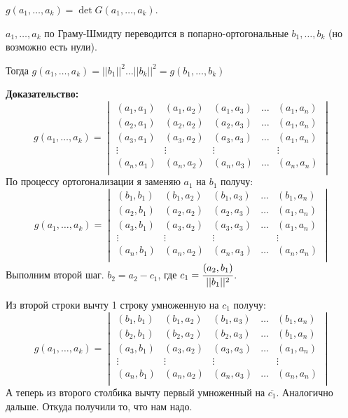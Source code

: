  $g(a_1,\ldots, a_k) = \det G(a_1,\ldots, a_k)$.


$a_1,\ldots, a_k$ по Граму-Шмидту переводится в попарно-ортогональные $b_1,\ldots,b_k$ (но возможно есть нули).

Тогда $g(a_1,\ldots, a_k) = ||b_1||^2\ldots ||b_k||^2 = g(b_1,\ldots,b_k)$

\textbf{Доказательство:}
$$g(a_1,\ldots, a_k) = \begin{vmatrix}
    (a_1,a_1) & (a_1, a_2) & (a_1,a_3) & \ldots & (a_1,a_n)\\
     (a_2,a_1) & (a_2, a_2) & (a_2,a_3) & \ldots & (a_1,a_n)\\
      (a_3,a_1) & (a_3, a_2) & (a_3,a_3) & \ldots & (a_1,a_n)\\
      \vdots & \vdots & \vdots & & \vdots \\
       (a_n,a_1) & (a_n, a_2) & (a_n,a_3) & \ldots & (a_n,a_n)\\
\end{vmatrix}$$
По процессу ортогонализации я заменяю $a_1$ на $b_1$ получу:
$$g(a_1,\ldots, a_k) = \begin{vmatrix}
    (b_1,b_1) & (b_1, a_2) & (b_1,a_3) & \ldots & (b_1,a_n)\\
     (a_2,b_1) & (a_2, a_2) & (a_2,a_3) & \ldots & (a_1,a_n)\\
      (a_3,b_1) & (a_3, a_2) & (a_3,a_3) & \ldots & (a_1,a_n)\\
      \vdots & \vdots & \vdots & & \vdots \\
       (a_n,b_1) & (a_n, a_2) & (a_n,a_3) & \ldots & (a_n,a_n)\\
\end{vmatrix}$$
Выполним второй шаг. $b_2 = a_2 -c_1$, где $c_1 = \cfrac{(a_2,b_1)}{||b_1||^2}$.

Из второй строки вычту 1 строку умноженную на $c_1$ получу:
$$g(a_1,\ldots, a_k) = \begin{vmatrix}
    (b_1,b_1) & (b_1, a_2) & (b_1,a_3) & \ldots & (b_1,a_n)\\
     (b_2,b_1) & (b_2, a_2) & (b_2,a_3) & \ldots & (b_1,a_n)\\
      (a_3,b_1) & (a_3, a_2) & (a_3,a_3) & \ldots & (a_1,a_n)\\
      \vdots & \vdots & \vdots & & \vdots \\
       (a_n,b_1) & (a_n, a_2) & (a_n,a_3) & \ldots & (a_n,a_n)\\
\end{vmatrix}$$
А теперь из второго столбика вычту первый умноженный на $\overline{c_1}$. Аналогично дальше. Откуда получили то, что нам надо.


